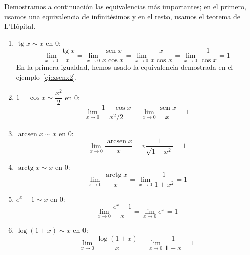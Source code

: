 \begin{ejemplo}
Demostramos a continuación las equivalencias más importantes;
en el primero, usamos una equivalencia de infinitésimos y en el resto, usamos el teorema de L'Hôpital.
\begin{enumerate}
\item
$\operatorname{tg} x  \sim  x$ en 0:
\[
\lim_{x\to 0}\dfrac{\operatorname{tg} x}x =
\lim_{x\to 0}\dfrac{\operatorname{sen} x}{x\cos x} =
\lim_{x\to 0}\dfrac{x}{x\cos x} =
\lim_{x\to 0}\dfrac1{\cos x} = 1
\]
En la primera igualdad, hemos usado la equivalencia demostrada en el ejemplo~\ref{ej:xsenx2}.

\item
$1-\cos x \sim \dfrac{x^2}{2}$ en 0:
\[
\lim_{x\to 0}\dfrac{1-\cos x}{x^2/2} = \lim_{x\to 0}\dfrac{\operatorname{sen} x}{x} =1
\]

\item
$\operatorname{arcsen} x \sim x$ en 0:
\[
\lim_{x\to 0}\dfrac{\operatorname{arcsen} x}{x} = v\dfrac1{\sqrt{1-x^2}} = 1
\]

\item
$\operatorname{arctg} x \sim x$ en 0:
\[
\lim_{x\to 0}\dfrac{\operatorname{arctg} x}{x} = \lim_{x\to 0}\dfrac1{1+x^2} = 1
\]

\item
$e^x-1 \sim x$ en 0:
\[
\lim_{x\to 0}\frac{e^x-1}x = \lim_{x\to 0} e^x = 1
\]

\item
$\log (1+x) \sim x$ en 0:
\[
\lim_{x\to 0} \dfrac{\log (1+x)}x = \lim_{x\to 0}\dfrac1{1+x} = 1
\]
\end{enumerate}
\end{ejemplo}

